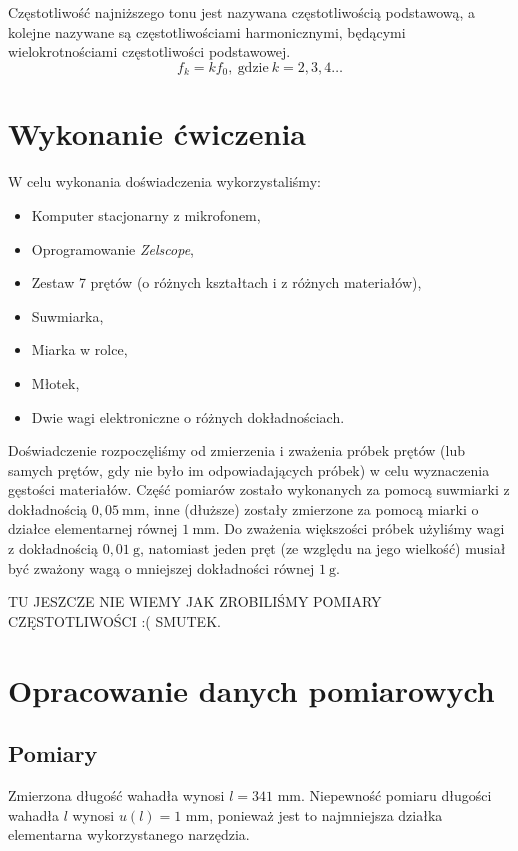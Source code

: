 \documentclass[12pt,a4paper]{article}
\begin{document}
Częstotliwość najniższego tonu jest nazywana częstotliwością podstawową, a kolejne nazywane są częstotliwościami harmonicznymi, będącymi wielokrotnościami częstotliwości podstawowej.
\begin{equation}
	f_k = kf_0,~\textrm{gdzie}~k = 2, 3, 4 \ldots
\end{equation}

\pagebreak
\section{Wykonanie ćwiczenia}
W celu wykonania doświadczenia wykorzystaliśmy:
\begin{itemize}
	\item Komputer stacjonarny z mikrofonem,
	\item Oprogramowanie \emph{Zelscope},
	\item Zestaw 7 prętów (o różnych kształtach i z różnych materiałów),
	\item Suwmiarka,
	\item Miarka w rolce,
	\item Młotek,
	\item Dwie wagi elektroniczne o różnych dokładnościach.
\end{itemize}

Doświadczenie rozpoczęliśmy od zmierzenia i zważenia próbek prętów (lub samych prętów, gdy nie było im odpowiadających próbek) w celu wyznaczenia gęstości materiałów. Część pomiarów zostało wykonanych za pomocą suwmiarki z dokładnością $0,05~\mathrm{mm}$, inne (dłuższe) zostały zmierzone za pomocą miarki o działce elementarnej równej $1~\mathrm{mm}$. Do zważenia większości próbek użyliśmy wagi z dokładnością $0,01~\mathrm{g}$, natomiast jeden pręt (ze względu na jego wielkość) musiał być zważony wagą o mniejszej dokładności równej $1~\mathrm{g}$.

TU JESZCZE NIE WIEMY JAK ZROBILIŚMY POMIARY CZĘSTOTLIWOŚCI :( SMUTEK.
\pagebreak
\section{Opracowanie danych pomiarowych}
\subsection{Pomiary}
Zmierzona długość wahadła wynosi $l = 341$ mm. Niepewność pomiaru długości wahadła $l$ wynosi $u(l) = 1$ mm, ponieważ jest to najmniejsza działka elementarna wykorzystanego narzędzia.
\end{document}
